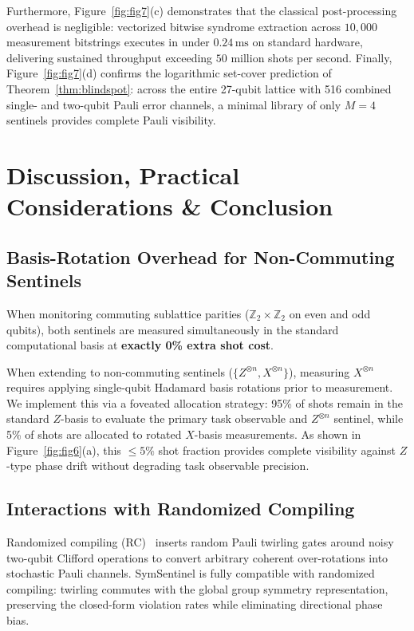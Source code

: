 \documentclass[aps,pra,twocolumn,superscriptaddress,10pt,floatfix]{revtex4-2}
\begin{document}
Furthermore, Figure~\ref{fig:fig7}(c) demonstrates that the classical post-processing overhead is negligible: vectorized bitwise syndrome extraction across $10,000$ measurement bitstrings executes in under $0.24\,\text{ms}$ on standard hardware, delivering sustained throughput exceeding $50$ million shots per second. Finally, Figure~\ref{fig:fig7}(d) confirms the logarithmic set-cover prediction of Theorem~\ref{thm:blindspot}: across the entire 27-qubit lattice with 516 combined single- and two-qubit Pauli error channels, a minimal library of only $M=4$ sentinels provides complete Pauli visibility.

\section{Discussion, Practical Considerations \& Conclusion}
\label{sec:discussion}

\subsection{Basis-Rotation Overhead for Non-Commuting Sentinels}
When monitoring commuting sublattice parities ($\mathbb{Z}_2 \times \mathbb{Z}_2$ on even and odd qubits), both sentinels are measured simultaneously in the standard computational basis at \textbf{exactly 0\% extra shot cost}.

When extending to non-commuting sentinels ($\{Z^{\otimes n}, X^{\otimes n}\}$), measuring $X^{\otimes n}$ requires applying single-qubit Hadamard basis rotations prior to measurement. We implement this via a foveated allocation strategy: 95\% of shots remain in the standard $Z$-basis to evaluate the primary task observable and $Z^{\otimes n}$ sentinel, while 5\% of shots are allocated to rotated $X$-basis measurements. As shown in Figure~\ref{fig:fig6}(a), this $\le 5\%$ shot fraction provides complete visibility against $Z$-type phase drift without degrading task observable precision.

\subsection{Interactions with Randomized Compiling}
Randomized compiling (RC)~\cite{wallman2016noise} inserts random Pauli twirling gates around noisy two-qubit Clifford operations to convert arbitrary coherent over-rotations into stochastic Pauli channels. SymSentinel is fully compatible with randomized compiling: twirling commutes with the global group symmetry representation, preserving the closed-form violation rates while eliminating directional phase bias.
\end{document}
